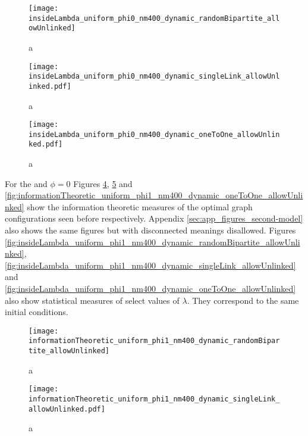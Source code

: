\begin{figure}
  \centering
  \texttt{[image: insideLambda\_uniform\_phi0\_nm400\_dynamic\_randomBipartite\_allowUnlinked]}
  \caption{a}
  \label{fig:insideLambda_uniform_phi0_nm400_dynamic_randomBipartite_allowUnlinked}
\end{figure}

\begin{figure}
  \centering
  \texttt{[image: insideLambda\_uniform\_phi0\_nm400\_dynamic\_singleLink\_allowUnlinked.pdf]}
  \caption{a}
  \label{fig:insideLambda_uniform_phi0_nm400_dynamic_singleLink_allowUnlinked}
\end{figure}

\begin{figure}
  \centering
  \texttt{[image: insideLambda\_uniform\_phi0\_nm400\_dynamic\_oneToOne\_allowUnlinked.pdf]}
  \caption{a}
  \label{fig:insideLambda_uniform_phi0_nm400_dynamic_oneToOne_allowUnlinked}
\end{figure}

For the \secondmodel{} and $\phi=0$ Figures \ref{fig:informationTheoretic_uniform_phi1_nm400_dynamic_randomBipartite_allowUnlinked},  \ref{fig:informationTheoretic_uniform_phi1_nm400_dynamic_singleLink_allowUnlinked} and \ref{fig:informationTheoretic_uniform_phi1_nm400_dynamic_oneToOne_allowUnlinked} show the information theoretic measures of the optimal graph configurations seen before respectively.
Appendix \ref{sec:app_figures_second-model} also shows the same figures but with disconnected meanings disallowed.
Figures \ref{fig:insideLambda_uniform_phi1_nm400_dynamic_randomBipartite_allowUnlinked}, \ref{fig:insideLambda_uniform_phi1_nm400_dynamic_singleLink_allowUnlinked} and \ref{fig:insideLambda_uniform_phi1_nm400_dynamic_oneToOne_allowUnlinked} also show statistical measures of select values of $\lambda$.
They correspond to the same initial conditions.

\begin{figure}
  \centering
  \texttt{[image: informationTheoretic\_uniform\_phi1\_nm400\_dynamic\_randomBipartite\_allowUnlinked]}
  \caption{a}
  \label{fig:informationTheoretic_uniform_phi1_nm400_dynamic_randomBipartite_allowUnlinked}
\end{figure}

\begin{figure}
  \centering
  \texttt{[image: informationTheoretic\_uniform\_phi1\_nm400\_dynamic\_singleLink\_allowUnlinked.pdf]}
  \caption{a}
  \label{fig:informationTheoretic_uniform_phi1_nm400_dynamic_singleLink_allowUnlinked}
\end{figure}

